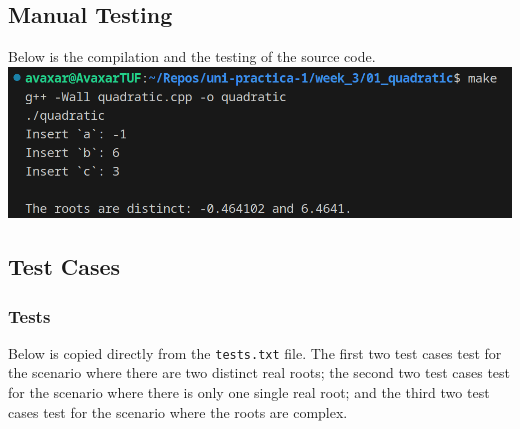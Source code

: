 \documentclass[12pt]{article}
\begin{document}
\subsection{Manual Testing}
Below is the compilation and the testing of the source code.
\newline\includegraphics[width=\textwidth]{01_quadratic}

\subsection{Test Cases}

\subsubsection{Tests}
Below is copied directly from the \texttt{tests.txt} file. The first two test cases test for the scenario where there are two distinct real roots; the second two test cases test for the scenario where there is only one single real root; and the third two test cases test for the scenario where the roots are complex.
\inputminted{text}{01_quadratic/tests.txt}
\end{document}

